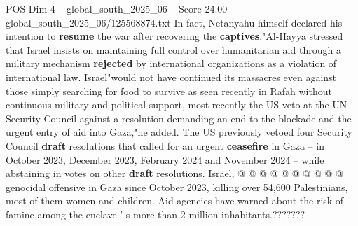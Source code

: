 \begin{textsample}{POS Dim 4 – global\_south\_2025\_06 – Score 24.00 – global\_south\_2025\_06/125568874.txt}
In fact, Netanyahu himself declared his intention to \textbf{resume} the war after recovering the \textbf{captives}."Al-Hayya stressed that Israel insists on maintaining full control over humanitarian aid through a military mechanism \textbf{rejected} by international organizations as a violation of international law.
Israel"would not have continued its massacres even against those simply searching for food to survive as seen recently in Rafah without continuous military and political support, most recently the US veto at the UN Security Council against a resolution demanding an end to the blockade and the urgent entry of aid into Gaza,"he added.
The US previously vetoed four Security Council \textbf{draft} resolutions that called for an urgent \textbf{ceasefire} in Gaza -- in October 2023, December 2023, February 2024 and November 2024 -- while abstaining in votes on other \textbf{draft} resolutions.
Israel, @ @ @ @ @ @ @ @ @ @ genocidal offensive in Gaza since October 2023, killing over 54,600 Palestinians, most of them women and children.
Aid agencies have warned about the risk of famine among the enclave ' s more than 2 million inhabitants.???????

\end{textsample}
